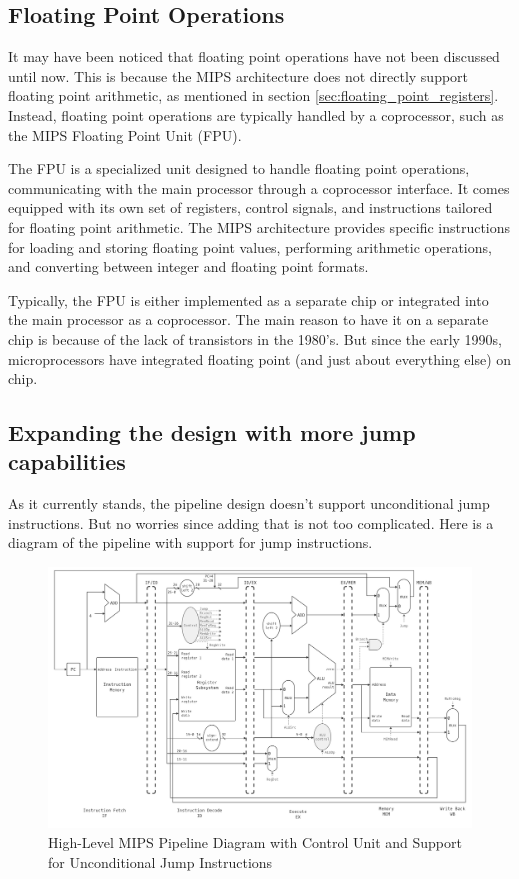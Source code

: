 \subsection{Floating Point Operations}
It may have been noticed that floating point operations have not been discussed until now. This is because the MIPS architecture does not directly support floating point arithmetic, as mentioned in section \ref{sec:floating_point_registers}. Instead, floating point operations are typically handled by a coprocessor, such as the MIPS Floating Point Unit (FPU)\cite{mirapuri1992mips}.

The FPU is a specialized unit designed to handle floating point operations, communicating with the main processor through a coprocessor interface. It comes equipped with its own set of registers, control signals, and instructions tailored for floating point arithmetic\cite{patterson1994computer}. The MIPS architecture provides specific instructions for loading and storing floating point values, performing arithmetic operations, and converting between integer and floating point formats.

Typically, the FPU is either implemented as a separate chip or integrated into the main processor as a coprocessor. The main reason to have it on a separate chip is because of the lack of transistors in the 1980's. But since the early 1990s, microprocessors
have integrated floating point (and just about everything else) on chip\cite{patterson1994computer}.
\subsection{Expanding the design with more jump capabilities}\label{sec:jump_capabilities}
As it currently stands, the pipeline design doesn't support unconditional jump instructions. But no worries since adding that is not too complicated. Here is a diagram of the pipeline with support for jump instructions.

\begin{figure}[H]
    \centering
    \includegraphics[width=1\textwidth]{assets/images/mips_pipeline_jump.png}
    \caption{High-Level MIPS Pipeline Diagram with Control Unit and Support for Unconditional Jump Instructions}
    \label{fig:mips_pipeline_jump}
\end{figure}

